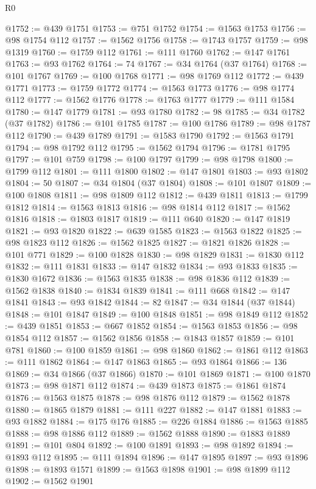 \begin{lexlean}{R0}
\begin{coremodule}
@1752 := @439 @1751
@1753 := @751 @1752
@1754 := @1563 @1753
@1756 := @98 @1754 @112
@1757 := @1562 @1756
@1758 := @1743 @1757
@1759 := @98 @1319
@1760 := @1759 @112
@1761 := @111 @1760
@1762 := @147 @1761
@1763 := @93 @1762
@1764 := 74
@1767 := @34 @1764 (@37 @1764)
@1768 := @101 @1767
@1769 := @100 @1768
@1771 := @98 @1769 @112
@1772 := @439 @1771
@1773 := @1759 @1772
@1774 := @1563 @1773
@1776 := @98 @1774 @112
@1777 := @1562 @1776
@1778 := @1763 @1777
@1779 := @111 @1584
@1780 := @147 @1779
@1781 := @93 @1780
@1782 := 98
@1785 := @34 @1782 (@37 @1782)
@1786 := @101 @1785
@1787 := @100 @1786
@1789 := @98 @1787 @112
@1790 := @439 @1789
@1791 := @1583 @1790
@1792 := @1563 @1791
@1794 := @98 @1792 @112
@1795 := @1562 @1794
@1796 := @1781 @1795
@1797 := @101 @759
@1798 := @100 @1797
@1799 := @98 @1798
@1800 := @1799 @112
@1801 := @111 @1800
@1802 := @147 @1801
@1803 := @93 @1802
@1804 := 50
@1807 := @34 @1804 (@37 @1804)
@1808 := @101 @1807
@1809 := @100 @1808
@1811 := @98 @1809 @112
@1812 := @439 @1811
@1813 := @1799 @1812
@1814 := @1563 @1813
@1816 := @98 @1814 @112
@1817 := @1562 @1816
@1818 := @1803 @1817
@1819 := @111 @640
@1820 := @147 @1819
@1821 := @93 @1820
@1822 := @639 @1585
@1823 := @1563 @1822
@1825 := @98 @1823 @112
@1826 := @1562 @1825
@1827 := @1821 @1826
@1828 := @101 @771
@1829 := @100 @1828
@1830 := @98 @1829
@1831 := @1830 @112
@1832 := @111 @1831
@1833 := @147 @1832
@1834 := @93 @1833
@1835 := @1830 @1672
@1836 := @1563 @1835
@1838 := @98 @1836 @112
@1839 := @1562 @1838
@1840 := @1834 @1839
@1841 := @111 @668
@1842 := @147 @1841
@1843 := @93 @1842
@1844 := 82
@1847 := @34 @1844 (@37 @1844)
@1848 := @101 @1847
@1849 := @100 @1848
@1851 := @98 @1849 @112
@1852 := @439 @1851
@1853 := @667 @1852
@1854 := @1563 @1853
@1856 := @98 @1854 @112
@1857 := @1562 @1856
@1858 := @1843 @1857
@1859 := @101 @781
@1860 := @100 @1859
@1861 := @98 @1860
@1862 := @1861 @112
@1863 := @111 @1862
@1864 := @147 @1863
@1865 := @93 @1864
@1866 := 136
@1869 := @34 @1866 (@37 @1866)
@1870 := @101 @1869
@1871 := @100 @1870
@1873 := @98 @1871 @112
@1874 := @439 @1873
@1875 := @1861 @1874
@1876 := @1563 @1875
@1878 := @98 @1876 @112
@1879 := @1562 @1878
@1880 := @1865 @1879
@1881 := @111 @227
@1882 := @147 @1881
@1883 := @93 @1882
@1884 := @175 @176
@1885 := @226 @1884
@1886 := @1563 @1885
@1888 := @98 @1886 @112
@1889 := @1562 @1888
@1890 := @1883 @1889
@1891 := @101 @804
@1892 := @100 @1891
@1893 := @98 @1892
@1894 := @1893 @112
@1895 := @111 @1894
@1896 := @147 @1895
@1897 := @93 @1896
@1898 := @1893 @1571
@1899 := @1563 @1898
@1901 := @98 @1899 @112
@1902 := @1562 @1901

\end{coremodule}
\end{lexlean}
